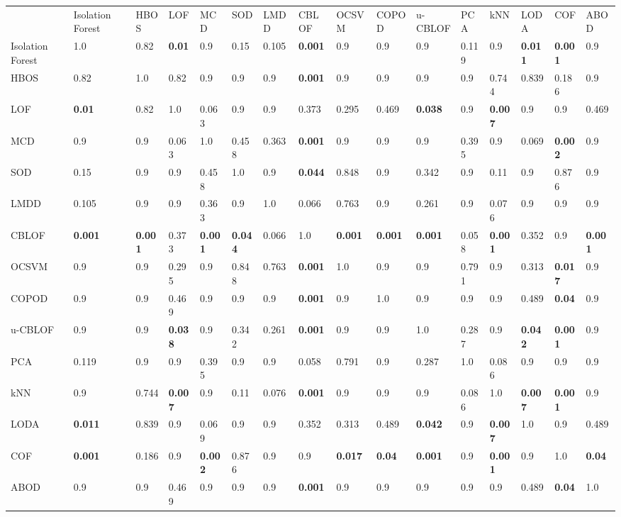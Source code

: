 \begin{tabular}{llllllllllllllll}
{} & {Isolation Forest} & {HBOS} & {LOF} & {MCD} & {SOD} & {LMDD} & {CBLOF} & {OCSVM} & {COPOD} & {u-CBLOF} & {PCA} & {kNN} & {LODA} & {COF} & {ABOD} \\
Isolation Forest & 1.0 & 0.82 & \textbf{0.01} & 0.9 & 0.15 & 0.105 & \textbf{0.001} & 0.9 & 0.9 & 0.9 & 0.119 & 0.9 & \textbf{0.011} & \textbf{0.001} & 0.9 \\
HBOS & 0.82 & 1.0 & 0.82 & 0.9 & 0.9 & 0.9 & \textbf{0.001} & 0.9 & 0.9 & 0.9 & 0.9 & 0.744 & 0.839 & 0.186 & 0.9 \\
LOF & \textbf{0.01} & 0.82 & 1.0 & 0.063 & 0.9 & 0.9 & 0.373 & 0.295 & 0.469 & \textbf{0.038} & 0.9 & \textbf{0.007} & 0.9 & 0.9 & 0.469 \\
MCD & 0.9 & 0.9 & 0.063 & 1.0 & 0.458 & 0.363 & \textbf{0.001} & 0.9 & 0.9 & 0.9 & 0.395 & 0.9 & 0.069 & \textbf{0.002} & 0.9 \\
SOD & 0.15 & 0.9 & 0.9 & 0.458 & 1.0 & 0.9 & \textbf{0.044} & 0.848 & 0.9 & 0.342 & 0.9 & 0.11 & 0.9 & 0.876 & 0.9 \\
LMDD & 0.105 & 0.9 & 0.9 & 0.363 & 0.9 & 1.0 & 0.066 & 0.763 & 0.9 & 0.261 & 0.9 & 0.076 & 0.9 & 0.9 & 0.9 \\
CBLOF & \textbf{0.001} & \textbf{0.001} & 0.373 & \textbf{0.001} & \textbf{0.044} & 0.066 & 1.0 & \textbf{0.001} & \textbf{0.001} & \textbf{0.001} & 0.058 & \textbf{0.001} & 0.352 & 0.9 & \textbf{0.001} \\
OCSVM & 0.9 & 0.9 & 0.295 & 0.9 & 0.848 & 0.763 & \textbf{0.001} & 1.0 & 0.9 & 0.9 & 0.791 & 0.9 & 0.313 & \textbf{0.017} & 0.9 \\
COPOD & 0.9 & 0.9 & 0.469 & 0.9 & 0.9 & 0.9 & \textbf{0.001} & 0.9 & 1.0 & 0.9 & 0.9 & 0.9 & 0.489 & \textbf{0.04} & 0.9 \\
u-CBLOF & 0.9 & 0.9 & \textbf{0.038} & 0.9 & 0.342 & 0.261 & \textbf{0.001} & 0.9 & 0.9 & 1.0 & 0.287 & 0.9 & \textbf{0.042} & \textbf{0.001} & 0.9 \\
PCA & 0.119 & 0.9 & 0.9 & 0.395 & 0.9 & 0.9 & 0.058 & 0.791 & 0.9 & 0.287 & 1.0 & 0.086 & 0.9 & 0.9 & 0.9 \\
kNN & 0.9 & 0.744 & \textbf{0.007} & 0.9 & 0.11 & 0.076 & \textbf{0.001} & 0.9 & 0.9 & 0.9 & 0.086 & 1.0 & \textbf{0.007} & \textbf{0.001} & 0.9 \\
LODA & \textbf{0.011} & 0.839 & 0.9 & 0.069 & 0.9 & 0.9 & 0.352 & 0.313 & 0.489 & \textbf{0.042} & 0.9 & \textbf{0.007} & 1.0 & 0.9 & 0.489 \\
COF & \textbf{0.001} & 0.186 & 0.9 & \textbf{0.002} & 0.876 & 0.9 & 0.9 & \textbf{0.017} & \textbf{0.04} & \textbf{0.001} & 0.9 & \textbf{0.001} & 0.9 & 1.0 & \textbf{0.04} \\
ABOD & 0.9 & 0.9 & 0.469 & 0.9 & 0.9 & 0.9 & \textbf{0.001} & 0.9 & 0.9 & 0.9 & 0.9 & 0.9 & 0.489 & \textbf{0.04} & 1.0 \\
\end{tabular}
